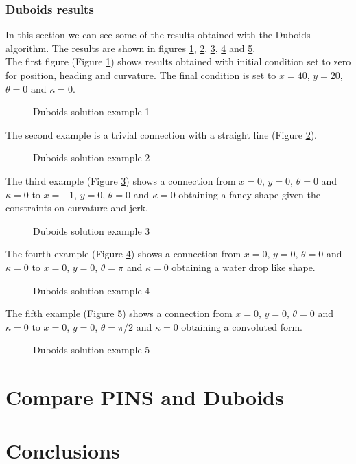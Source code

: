 \documentclass[11pt,twocolumn]{scrartcl}
\begin{document}
\subsubsection*{Duboids results}
%
In this section we can see some of the results obtained with the Duboids algorithm. The results are shown in figures \ref{fig:DuboidsRes0}, \ref{fig:DuboidsRes1}, \ref{fig:DuboidsRes2}, \ref{fig:DuboidsRes3} and \ref{fig:DuboidsRes4}.\\
The first figure (Figure \ref{fig:DuboidsRes0}) shows results obtained with initial condition set to zero for position, heading and curvature. The final condition is set to $x = 40$, $y=20$, $\theta=0$ and $\kappa=0$.\\
%
\begin{figure}[ht]
  \centering
  \caption{Duboids solution example 1}
  \label{fig:DuboidsRes0}
\end{figure}
%
The second example is a trivial connection with a straight line (Figure \ref{fig:DuboidsRes1}).\\
%
\begin{figure}[ht]
  \centering
  \caption{Duboids solution example 2}
  \label{fig:DuboidsRes1}
\end{figure}
%
The third example (Figure \ref{fig:DuboidsRes2}) shows a connection from $x=0$, $y=0$, $\theta=0$ and $\kappa=0$ to $x=-1$, $y=0$, $\theta=0$ and $\kappa=0$ obtaining a fancy shape given the constraints on curvature and jerk.\\
%
\begin{figure}[ht]
  \centering
  \caption{Duboids solution example 3}
  \label{fig:DuboidsRes2}
\end{figure}
%
The fourth example (Figure \ref{fig:DuboidsRes3}) shows a connection from $x=0$, $y=0$, $\theta=0$ and $\kappa=0$ to $x=0$, $y=0$, $\theta=\pi$ and $\kappa=0$ obtaining a water drop like shape.\\
%
\begin{figure}[ht]
  \centering
  \caption{Duboids solution example 4}
  \label{fig:DuboidsRes3}
\end{figure}
%
The fifth example (Figure \ref{fig:DuboidsRes4}) shows a connection from $x=0$, $y=0$, $\theta=0$ and $\kappa=0$ to $x=0$, $y=0$, $\theta=\pi/2$ and $\kappa=0$ obtaining a convoluted form.\\
%
\begin{figure}[ht]
  \centering
  \caption{Duboids solution example 5}
  \label{fig:DuboidsRes4}
\end{figure}
%

\section*{Compare PINS and Duboids}

\section*{Conclusions}






%

%



 
\end{document}
